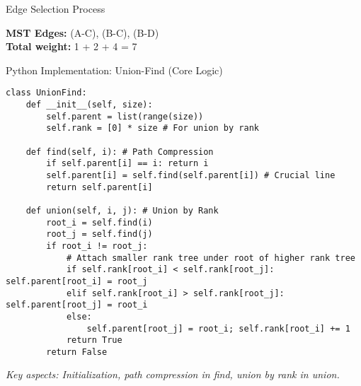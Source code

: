 \documentclass{beamer}
\begin{document}
\begin{frame}{Edge Selection Process}
\centering
{}
\vspace{0.5cm}
\scriptsize
\textbf{MST Edges:} (A-C), (B-C), (B-D) \\
\textbf{Total weight:} 1 + 2 + 4 = 7
\end{frame}

\begin{frame}[fragile]{Python Implementation: Union-Find (Core Logic)}
\begin{verbatim}
class UnionFind:
    def __init__(self, size):
        self.parent = list(range(size))
        self.rank = [0] * size # For union by rank

    def find(self, i): # Path Compression
        if self.parent[i] == i: return i
        self.parent[i] = self.find(self.parent[i]) # Crucial line
        return self.parent[i]

    def union(self, i, j): # Union by Rank
        root_i = self.find(i)
        root_j = self.find(j)
        if root_i != root_j:
            # Attach smaller rank tree under root of higher rank tree
            if self.rank[root_i] < self.rank[root_j]: self.parent[root_i] = root_j
            elif self.rank[root_i] > self.rank[root_j]: self.parent[root_j] = root_i
            else:
                self.parent[root_j] = root_i; self.rank[root_i] += 1
            return True
        return False
\end{verbatim}
\vspace{2mm} %
\tiny \textit{Key aspects: Initialization, path compression in find, union by rank in union.}
\end{frame}
\end{document}
